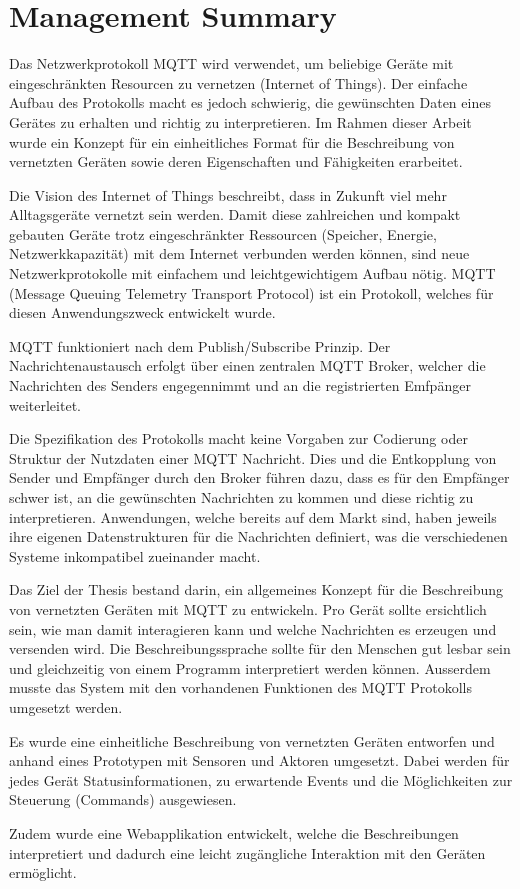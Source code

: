 \chapter*{Management Summary}
\label{chap:managementSummary}

\color{black}

Das Netzwerkprotokoll MQTT wird verwendet, um beliebige Geräte mit eingeschränkten Resourcen zu vernetzen (Internet of Things). Der einfache Aufbau des Protokolls macht es jedoch schwierig, die gewünschten Daten eines Gerätes zu erhalten und richtig zu interpretieren. Im Rahmen dieser Arbeit wurde ein Konzept für ein einheitliches Format für die Beschreibung von vernetzten Geräten sowie deren Eigenschaften und Fähigkeiten erarbeitet.


Die Vision des Internet of Things beschreibt, dass in Zukunft viel mehr Alltagsgeräte vernetzt sein werden. Damit diese zahlreichen und kompakt gebauten Geräte trotz eingeschränkter Ressourcen (Speicher, Energie, Netzwerkkapazität) mit dem Internet verbunden werden können, sind neue Netzwerkprotokolle mit einfachem und leichtgewichtigem Aufbau nötig. MQTT (Message Queuing Telemetry Transport Protocol) ist ein Protokoll, welches für diesen Anwendungszweck entwickelt wurde.

MQTT funktioniert nach dem Publish/Subscribe Prinzip. Der Nachrichtenaustausch erfolgt über einen zentralen MQTT Broker, welcher die Nachrichten des Senders engegennimmt und an die registrierten Emfpänger weiterleitet.


Die Spezifikation des Protokolls macht keine Vorgaben zur Codierung oder Struktur der Nutzdaten einer MQTT Nachricht. Dies und die Entkopplung von Sender und Empfänger durch den Broker führen dazu, dass es für den Empfänger schwer ist, an die gewünschten Nachrichten zu kommen und diese richtig zu interpretieren. 
Anwendungen, welche bereits auf dem Markt sind, haben jeweils ihre eigenen Datenstrukturen für die Nachrichten definiert, was die verschiedenen Systeme inkompatibel zueinander macht.


Das Ziel der Thesis bestand darin, ein allgemeines Konzept für die Beschreibung von vernetzten Geräten mit MQTT zu entwickeln. Pro Gerät sollte ersichtlich sein, wie man damit interagieren kann und welche Nachrichten es erzeugen und versenden wird.
Die Beschreibungssprache sollte für den Menschen gut lesbar sein und gleichzeitig von einem Programm interpretiert werden können.
Ausserdem musste das System mit den vorhandenen Funktionen des MQTT Protokolls umgesetzt werden.


Es wurde eine einheitliche Beschreibung von vernetzten Geräten entworfen und anhand eines Prototypen mit Sensoren und Aktoren umgesetzt.
Dabei werden für jedes Gerät Statusinformationen, zu erwartende Events und die Möglichkeiten zur Steuerung (Commands) ausgewiesen.

Zudem wurde eine Webapplikation entwickelt, welche die Beschreibungen interpretiert und dadurch eine leicht zugängliche Interaktion mit den Geräten ermöglicht.